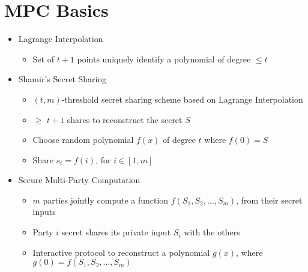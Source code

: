 \hypertarget{mpc-basics}{%
\chapter{MPC Basics}\label{mpc-basics}}

\begin{itemize}
\tightlist
\item
  Lagrange Interpolation

  \begin{itemize}
  \tightlist
  \item
    Set of \(t+1\) points uniquely identify a polynomial of degree
    \(\leq t\)
  \end{itemize}
\item
  Shamir's Secret Sharing

  \begin{itemize}
  \tightlist
  \item
    \((t, m)\)-threshold secret sharing scheme based on Lagrange
    Interpolation
  \item
    \(\geq\) \(t+1\) shares to reconstruct the secret \(S\)
  \item
    Choose random polynomial \(f(x)\) of degree \(t\) where \(f(0) = S\)
  \item
    Share \(s_i = f(i)\), for \(i \in [1,m]\)
  \end{itemize}
\item
  Secure Multi-Party Computation

  \begin{itemize}
  \tightlist
  \item
    \(m\) parties jointly compute a function
    \(f(S_{1},S_{2},\dots,S_{m})\), from their secret inputs
  \item
    Party \(i\) secret shares its private input \(S_{i}\) with the
    others
  \item
    Interactive protocol to reconstruct a polynomial \(g(x)\), where
    \(g(0)=f(S_1, S_2, \dots, S_m)\)
  \end{itemize}
\end{itemize}
